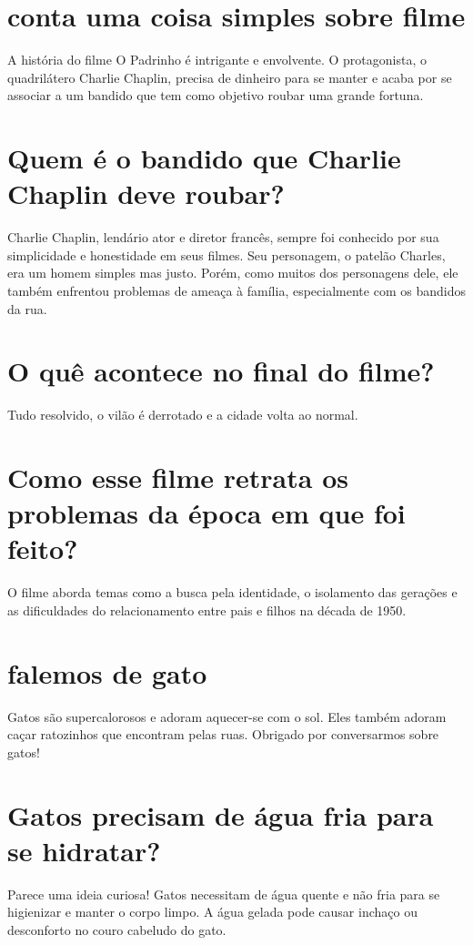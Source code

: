 \documentclass[11pt,a4paper]{article}
\begin{document}
\section{conta uma coisa simples sobre filme}
A história do filme O Padrinho é intrigante e envolvente. O protagonista, o quadrilátero Charlie Chaplin, precisa de dinheiro para se manter e acaba por se associar a um bandido que tem como objetivo roubar uma grande fortuna.

\section{Quem é o bandido que Charlie Chaplin deve roubar?}
Charlie Chaplin, lendário ator e diretor francês, sempre foi conhecido por sua simplicidade e honestidade em seus filmes. Seu personagem, o patelão Charles, era um homem simples mas justo. Porém, como muitos dos personagens dele, ele também enfrentou problemas de ameaça à família, especialmente com os bandidos da rua.

\section{O quê acontece no final do filme?}
Tudo resolvido, o vilão é derrotado e a cidade volta ao normal.

\section{Como esse filme retrata os problemas da época em que foi feito?}
O filme aborda temas como a busca pela identidade, o isolamento das gerações e as dificuldades do relacionamento entre pais e filhos na década de 1950.

\section{falemos de gato}
Gatos são supercalorosos e adoram aquecer-se com o sol. Eles também adoram caçar ratozinhos que encontram pelas ruas. Obrigado por conversarmos sobre gatos!

\section{Gatos precisam de água fria para se hidratar?}
Parece uma ideia curiosa! Gatos necessitam de água quente e não fria para se higienizar e manter o corpo limpo. A água gelada pode causar inchaço ou desconforto no couro cabeludo do gato.
\end{document}
